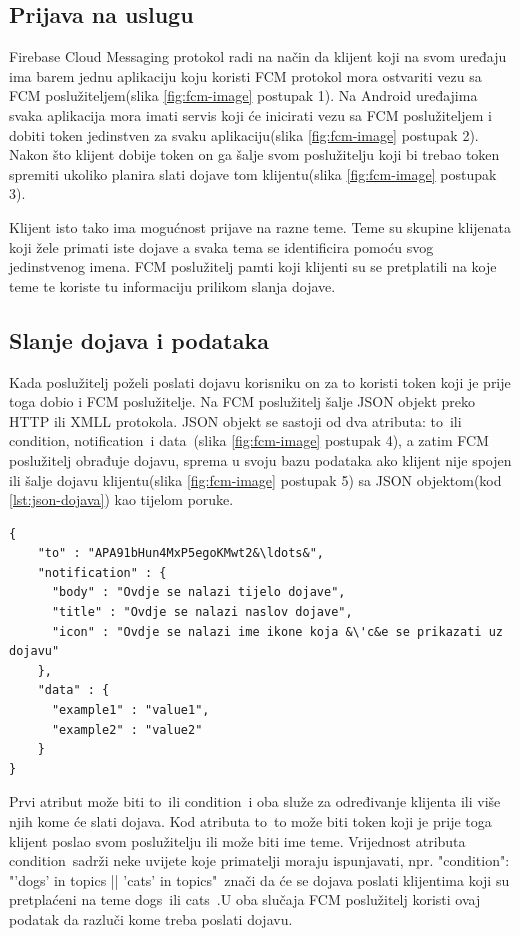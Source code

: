 \documentclass[times, utf8, zavrsni]{fer}
\begin{document}
\subsection{Prijava na uslugu}
Firebase Cloud Messaging protokol radi na način da klijent koji na svom uređaju ima barem jednu aplikaciju koju koristi FCM protokol mora ostvariti vezu sa FCM poslužiteljem(slika \ref{fig:fcm-image} postupak 1). Na Android uređajima svaka aplikacija mora imati servis koji će inicirati vezu sa FCM poslužiteljem i dobiti token jedinstven za svaku aplikaciju(slika \ref{fig:fcm-image} postupak 2). Nakon što klijent dobije token on ga šalje svom poslužitelju koji bi trebao token spremiti ukoliko planira slati dojave tom klijentu(slika \ref{fig:fcm-image} postupak 3). 

Klijent isto tako ima mogućnost prijave na razne teme. Teme su skupine klijenata koji žele primati iste dojave a svaka tema se identificira pomoću svog jedinstvenog imena. FCM poslužitelj pamti koji klijenti su se pretplatili na koje teme te koriste tu informaciju prilikom slanja dojave.

\subsection{Slanje dojava i podataka}
Kada poslužitelj poželi poslati dojavu korisniku on za to koristi token koji je prije toga dobio i FCM poslužitelje. Na FCM poslužitelj šalje JSON objekt preko HTTP ili XMLL protokola. JSON objekt se sastoji od dva atributa: \glqq to\grqq\  ili \glqq condition\grqq , \glqq notification\grqq\  i \glqq data\grqq\ (slika \ref{fig:fcm-image} postupak 4), a zatim FCM poslužitelj obrađuje dojavu, sprema u svoju bazu podataka ako klijent nije spojen ili šalje dojavu klijentu(slika \ref{fig:fcm-image} postupak 5) sa JSON objektom(kod \ref{lst:json-dojava}) kao tijelom poruke.

\begin{lstlisting}[caption=Primjer JSON objekta kojeg poslužitelj šalje FCM poslužitelju za slanje dojave, label=lst:json-dojava, float]
{
    "to" : "APA91bHun4MxP5egoKMwt2&\ldots&",
    "notification" : {
      "body" : "Ovdje se nalazi tijelo dojave",
      "title" : "Ovdje se nalazi naslov dojave",
      "icon" : "Ovdje se nalazi ime ikone koja &\'c&e se prikazati uz dojavu"
    },
    "data" : {
      "example1" : "value1",
      "example2" : "value2"
    }
}
\end{lstlisting}

Prvi atribut može biti \glqq to\grqq\  ili \glqq condition\grqq\  i oba služe za određivanje klijenta ili više njih kome će slati dojava. Kod atributa \glqq to\grqq\  to može biti token koji je prije toga klijent poslao svom poslužitelju ili može biti ime teme. Vrijednost atributa \glqq condition\grqq\  sadrži neke uvijete koje primatelji moraju ispunjavati, npr. \glqq "condition": "'dogs' in topics || 'cats' in topics"\grqq\  znači da će se dojava poslati klijentima koji su pretplaćeni na teme \glqq dogs\grqq\  ili \glqq cats\grqq\ .U oba slučaja FCM poslužitelj koristi ovaj podatak da razluči kome treba poslati dojavu.
\end{document}
